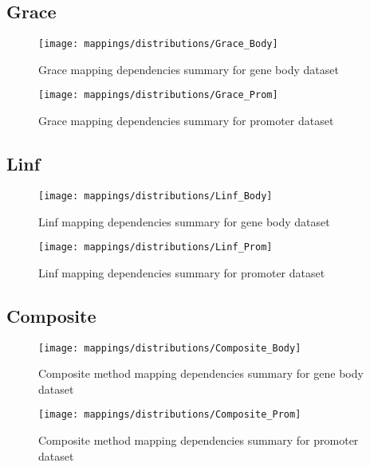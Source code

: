 \pagebreak
\subsection{Grace}

\begin{figure}[H]
	\centering
	\texttt{[image: mappings/distributions/Grace\_Body]}
	\caption{Grace mapping dependencies summary for gene body dataset}
	\label{fig:map_body_grace}
\end{figure}

\begin{figure}[H]
	\centering
	\texttt{[image: mappings/distributions/Grace\_Prom]}
	\caption{Grace mapping dependencies summary for promoter dataset}
	\label{fig:map_prom_grace}
\end{figure}


\pagebreak
\subsection{Linf}

\begin{figure}[H]
	\centering
	\texttt{[image: mappings/distributions/Linf\_Body]}
	\caption{Linf mapping dependencies summary for gene body dataset}
	\label{fig:map_body_linf}
\end{figure}

\begin{figure}[H]
	\centering
	\texttt{[image: mappings/distributions/Linf\_Prom]}
	\caption{Linf mapping dependencies summary for promoter dataset}
	\label{fig:map_prom_linf}
\end{figure}


\pagebreak
\subsection{Composite}

\begin{figure}[H]
	\centering
	\texttt{[image: mappings/distributions/Composite\_Body]}
	\caption{Composite method mapping dependencies summary for gene body dataset}
	\label{fig:map_body_comp}
\end{figure}

\begin{figure}[H]
	\centering
	\texttt{[image: mappings/distributions/Composite\_Prom]}
	\caption{Composite method mapping dependencies summary for promoter dataset}
	\label{fig:map_prom_comp}
\end{figure}